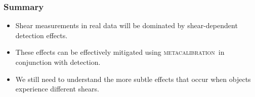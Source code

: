 \documentclass{beamer}
\newcommand{\mcal}{\textsc{metacalibration}}
\begin{document}
\frame
{
    \frametitle{Summary}

 
    \begin{itemize}

        \item Shear measurements in real data will be dominated by
            shear-dependent detection effects.

        \item These effects can be effectively mitigated using
            \mcal\ in conjunction with detection.

        \item We still need to understand the more subtle effects that occur
            when objects experience different shears.

    \end{itemize}

}


 


\end{document}
